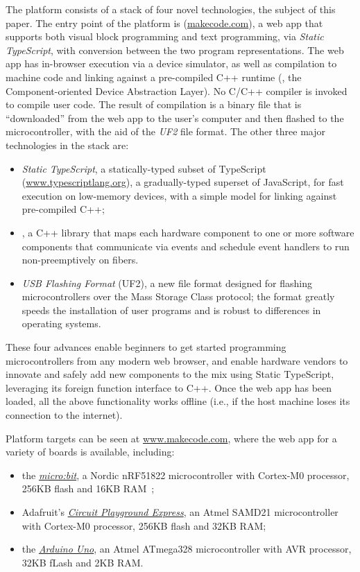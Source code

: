 The platform consists of a stack of four novel technologies, the subject of
this paper. The entry point of the platform is \emph{\MC} (\href{https://makecode.com}{makecode.com}),
a web app that supports both visual block programming and text programming,
via \emph{Static TypeScript}, with conversion 
between the two program representations. The web app has in-browser execution 
via a device simulator, as well as compilation to machine code and linking against a 
pre-compiled C++ runtime (\emph{\CON}, the Component-oriented Device Abstraction Layer). No C/C++ compiler is invoked to compile user code. 
The result of compilation is a binary file that is ``downloaded'' from the web app to the user's 
computer and then flashed to the microcontroller, with the aid of the \emph{UF2} file format. The other three major technologies in the stack are:
\begin{itemize}

\item \emph{Static TypeScript}, a statically-typed subset of TypeScript (\url{www.typescriptlang.org}), 
a gradually-typed superset of JavaScript, for fast execution on low-memory devices, with
a simple model for linking against pre-compiled C++; 

\item \emph{\CO}, a C++ library that maps 
each hardware component to one or more software components that communicate via events and
schedule event handlers to run non-preemptively on fibers. 

\item \emph{USB Flashing Format} (UF2), a new file format designed for flashing microcontrollers over the Mass Storage
Class protocol; the format greatly speeds the installation of user 
programs and is robust to differences in operating systems. 
\end{itemize}
These four advances enable beginners to get started programming microcontrollers from any modern web browser, and enable
hardware vendors to innovate and safely add new components to the mix using Static TypeScript, leveraging its
foreign function interface to C++. 
Once the web app has been loaded, 
all the above functionality works offline (i.e., if the host machine loses its connection 
to the internet).

Platform targets can be seen at \url{www.makecode.com}, where the \MC web app for a variety of boards is available, 
including:
\begin{itemize}
\item the \emph{\href{https://microbit.org}{micro:bit}}, a Nordic nRF51822 microcontroller with Cortex-M0 processor, 256KB flash and 16KB RAM~\cite{microbitICSE2016};
\item Adafruit's \emph{\href{https:/adafruit.com/products/3333}{Circuit Playground Express}}, an Atmel SAMD21 microcontroller with Cortex-M0 processor, 256KB flash and 32KB RAM;
\item the \emph{\href{https://store.arduino.cc/usa/arduino-uno-rev3}{Arduino Uno}}, an Atmel ATmega328 microcontroller with AVR processor, 32KB fLash and 2KB RAM.
\end{itemize}


